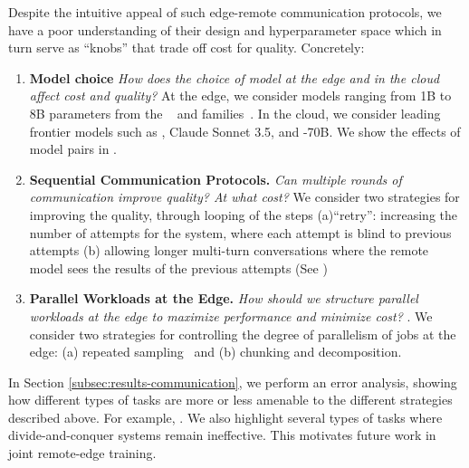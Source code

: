 

Despite the intuitive appeal of such edge-remote communication protocols, we have a poor understanding of their design and hyperparameter space which in turn serve as ``knobs'' that trade off cost for quality. Concretely:
\begin{enumerate}
  \item \textbf{Model choice} \textit{How does the choice of model at the edge and in the cloud affect cost and quality?} At the edge, we consider models ranging from 1B to 8B parameters from the \llama~\citep{dubey2024llama3} and \qwen families~\citep{bai2024qwen2.5}. In the cloud, we consider leading frontier models such as \gpt, Claude Sonnet 3.5, and -70B. We show the effects of model pairs in .
  \item \textbf{Sequential Communication Protocols.} \textit{Can multiple rounds of communication improve quality? At what cost?} We consider two strategies for improving the quality, through looping of the \system steps (a)``retry'': increasing the number of attempts for the \system system, where each attempt is blind to previous attempts (b) allowing longer multi-turn conversations where the remote model sees the results of the previous attempts (See )
  \item \textbf{Parallel Workloads at the Edge.} \textit{How should we structure parallel workloads at the edge to maximize performance and minimize cost?} . We consider two strategies for controlling the degree of parallelism of jobs at the edge: (a)  repeated sampling~\citep{brown2024large} and (b) chunking and decomposition. 
\end{enumerate}

In Section \ref{subsec:results-communication}, we perform an error analysis, showing how different types of tasks are more or less amenable to the different strategies described above. For example, . We also highlight several types of tasks where divide-and-conquer systems remain ineffective. This motivates future work in joint remote-edge training.


